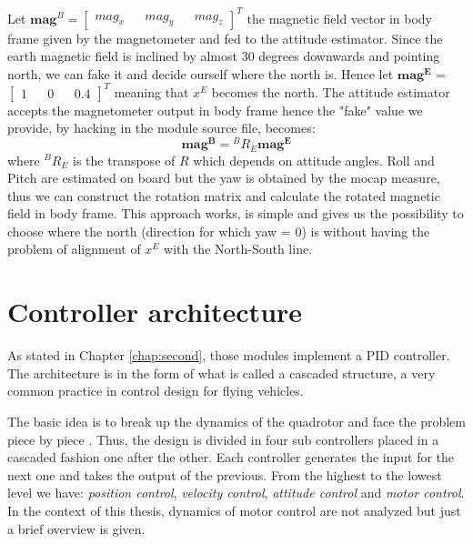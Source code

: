 \noindent
Let $\boldsymbol{mag}^B = \begin{bmatrix}mag_x && mag_y && mag_z\end{bmatrix}^T$ the magnetic field vector in body frame given by the magnetometer and fed to the attitude estimator. Since the earth magnetic field is inclined by almost 30 degrees downwards and pointing north, we can fake it and decide ourself where the north is. Hence let $\boldsymbol{mag^E}$ = $\begin{bmatrix}1&& 0 && 0.4\end{bmatrix}^T$ meaning that $x^E$ becomes the north. The attitude estimator accepts the magnetometer output in body frame hence the "fake" value we provide, by hacking in the module source file, becomes:
\begin{equation}
	 \boldsymbol{mag^B} = {}^BR_E \boldsymbol{mag^E}
\end{equation}
where  ${}^BR_E$ is the transpose of $R$ which depends on attitude angles. Roll and Pitch are estimated on board but the yaw is obtained by the mocap measure, thus we can construct the rotation matrix and calculate the rotated magnetic field in body frame. This approach works, is simple and gives us the possibility to choose where the north (direction for which yaw = 0) is without having the problem of alignment of $x^E$ with the North-South line.

\section{Controller architecture}

As stated in Chapter \ref{chap:second}, those modules implement a PID controller. The architecture is in the form of what is called a cascaded structure, a very common practice in control design for flying vehicles. 

The basic idea is to break up the dynamics of the quadrotor and face the problem piece by piece \cite{Mellinger2012}. Thus, the design is divided in four sub controllers placed in a cascaded fashion one after the other. Each controller generates the input for the next one and takes the output of the previous. From the highest to the lowest level we have:\textit{ position control}, \textit{velocity control}, \textit{attitude control} and\textit{ motor control}. In the context of this thesis, dynamics of motor control are not analyzed but just a brief overview is given. 

